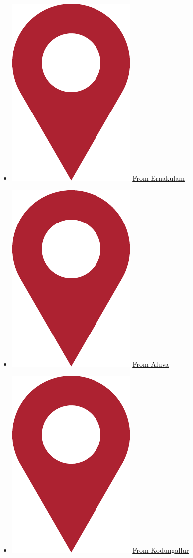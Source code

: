 \documentclass{article}
\newcommand*{\pin}{%
  \includegraphics[height=\heightof{M}]{pin}%
}
\begin{document}
\begin{itemize}
	\item[] {\normalsize \pin} \underline{\href{https://www.google.co.in/maps/dir/Mount+Carmel+Church,+Pottakuzhi+-+Mamangalam+Rd,+Mamangalam,+Elamakkara,+Ernakulam,+Kerala+682025/Cherai+Beach+Resorts,+Cherai,+Vypin,+Kerala/@10.0633394,76.1809834,12z/data=!3m1!4b1!4m13!4m12!1m5!1m1!1s0x3b080d0fa96af125:0x696a9989e82b6c02!2m2!1d76.3032795!2d10.0093666!1m5!1m1!1s0x3b0810a300000001:0xebdd3e12cda825ee!2m2!1d76.1986595!2d10.1363985}{From Ernakulam}}

	\item[] {\normalsize \pin} \underline{\href{https://www.google.co.in/maps/dir/Aluva+Railway+Station,+Periyar+Nagar,+Aluva,+Kerala/Cherai+Beach+Resorts,+Cherai,+Vypin,+Kerala/@10.126786,76.2902413,13.25z/data=!4m13!4m12!1m5!1m1!1s0x3b080f29eb7eb615:0xb454e4d93b04846c!2m2!1d76.3567139!2d10.1086654!1m5!1m1!1s0x3b086d34d768e025:0x4fa5702ae301f77f!2m2!1d76.1805941!2d10.1363345}{From Aluva}}
	\item[] {\normalsize \pin} \underline{\href{https://www.google.co.in/maps/dir/Kodungallur+Bhagavathy+Temple,+Kodungallur,+Kerala/Cherai+Beach+Resorts,+Cherai,+Vypin,+Kerala/@10.1821016,76.1630008,13z/data=!3m1!4b1!4m13!4m12!1m5!1m1!1s0x3b081bf47f4c042f:0x7e6f994f0db02349!2m2!1d76.1984602!2d10.2268941!1m5!1m1!1s0x3b086d34d768e025:0x4fa5702ae301f77f!2m2!1d76.1805941!2d10.1363345}{From Kodungallur}}
\end{itemize}
\end{document}
